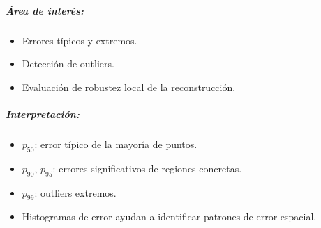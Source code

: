 \documentclass[12pt, a4paper, twoside]{article}
\begin{document}
\subparagraph{Área de interés:}
\begin{itemize}
  \item Errores típicos y extremos.
  \item Detección de outliers.
  \item Evaluación de robustez local de la reconstrucción.
\end{itemize}

\subparagraph{Interpretación:}
\begin{itemize}
  \item $p_{50}$: error típico de la mayoría de puntos.  
  \item $p_{90}$, $p_{95}$: errores significativos de regiones concretas.  
  \item $p_{99}$: outliers extremos.  
  \item Histogramas de error ayudan a identificar patrones de error espacial.
\end{itemize}
\end{document}

